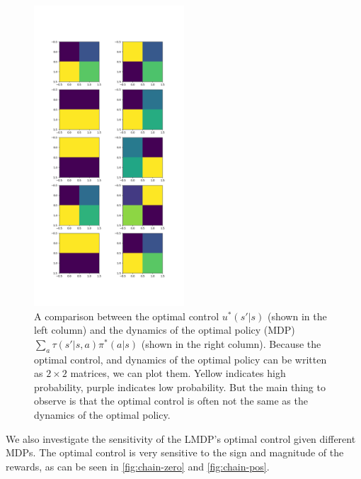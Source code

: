 \begin{figure}[h!]
\centering
\includegraphics[width=0.5\textwidth,height=0.75\textheight]{../../pictures/figures/lmdp_mdp_optimal_dynamics.png}
\caption{A comparison between the optimal control $u^{* }(s'|s)$ (shown in the left column) and the dynamics of the optimal policy (MDP) $\sum_a \tau(s'|s, a)\pi^{* }(a|s)$ (shown in the right column). Because the optimal control, and dynamics of the optimal policy can be written as $2\times 2$ matrices, we can plot them. Yellow indicates high probability, purple indicates low probability. But the main thing to observe is that the optimal control is often not the same as the dynamics of the optimal policy.}
\label{fig:opt-control}
\end{figure}

We also investigate the sensitivity of the LMDP's optimal control given different MDPs.
The optimal control is very sensitive to the sign and magnitude of the rewards, as can be seen in \ref{fig:chain-zero} and \ref{fig:chain-pos}.


